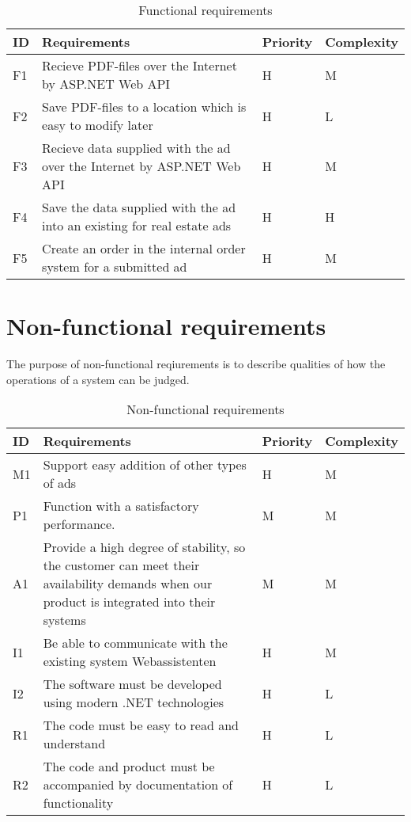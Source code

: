 \begin{table}[H]
\begin{tabular}{|p{1.5cm}|p{8cm}|p{2cm}|p{3cm}|}
	\hline
	\textbf{ID} & \textbf{Requirements} & \textbf{Priority} & \textbf{Complexity}\\
	\hline F1 & Recieve PDF-files over the Internet by ASP.NET Web API & H & M \\
	\hline
	F2 & Save PDF-files to a location which is easy to modify later & H & L \\
	\hline
	F3 & Recieve data supplied with the ad over the Internet by ASP.NET Web API & H & M \\
	\hline
	F4 & Save the data supplied with the ad into an existing for real estate ads & H & H \\
	\hline
	F5 & Create an order in the internal order system for a submitted ad & H & M \\
	\hline
	
\end{tabular}
\caption{Functional requirements}
\end{table}

\newpage
\section{Non-functional requirements} 
The purpose of non-functional reqiurements is to describe qualities of how the operations of a system can be judged. 

\normalsize
\begin{table}[H]
\begin{tabular}{|p{1.5cm}|p{8cm}|p{2cm}|p{3cm}|}
	\hline
	\textbf{ID} & \textbf{Requirements} & \textbf{Priority} & \textbf{Complexity}\\
	\hline
	M1 & Support easy addition of other types of ads & H & M \\
	\hline
	P1 & Function with a satisfactory performance. & M & M \\
	\hline
	A1 & Provide a high degree of stability, so the customer can meet their availability demands when our product is integrated into their systems & M & M\\
	\hline
	I1 & Be able to communicate with the existing system Webassistenten & H & M \\
	\hline
	I2 & The software must be developed using modern .NET technologies & H & L \\
	\hline
	R1 & The code must be easy to read and understand & H & L \\ 
	\hline
	R2 & The code and product must be accompanied by documentation of functionality & H & L \\
	\hline
	
	
\end{tabular}
\caption{Non-functional requirements}
\end{table}